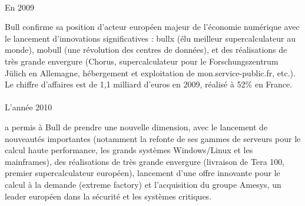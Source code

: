 \documentclass{article}
\begin{document}
		\paragraph{}
		\begin{bf}En 2009\end{bf} Bull confirme sa position d’acteur européen majeur de l’économie numérique avec le 
		lancement d’innovations significatives : bullx (élu meilleur supercalculateur au monde), mobull 
		(une révolution des centres de données), et des réalisations de très grande envergure (Chorus, supercalculateur pour le 
		Forschungszentrum Jülich en Allemagne, hébergement et exploitation de mon.service-public.fr, etc.). Le chiffre 
		d'affaires est de 1,1 milliard d'euros en 2009, réalisé à 52\% en France.
		\paragraph{}
		\begin{bf}L’année 2010\end{bf} a permis à Bull de prendre une nouvelle dimension, avec le lancement de nouveautés 
		importantes (notamment la refonte de ses gammes de serveurs pour le calcul haute performance, les grands systèmes 
		Windows/Linux et les mainframes), des réalisations de très grande envergure (livraison de Tera 100, premier 
		supercalculateur européen), lancement d’une offre innovante pour le calcul à la demande (extreme factory) et 
		l’acquisition du groupe Amesys, un leader européen dans la sécurité et les systèmes critiques.
\end{document}
